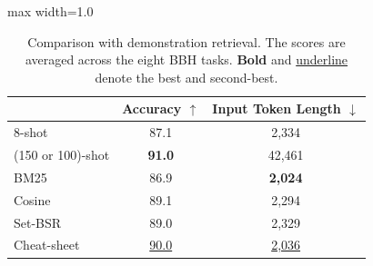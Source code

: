 \begin{table}[t]
\centering
\begin{adjustbox}{max width=1.0\columnwidth}
\begin{tabular}{lcc}
\toprule
 & \textbf{Accuracy} $\uparrow$ & \textbf{Input Token Length} $\downarrow$ \\
\midrule
8-shot & 87.1 & 2,334 \\
(150 or 100)-shot & \textbf{91.0} & 42,461 \\
\midrule
BM25 & 86.9 & \textbf{2,024} \\
Cosine & 89.1 & 2,294 \\
Set-BSR & 89.0 & 2,329 \\
\midrule
Cheat-sheet & \underline{90.0} & \underline{2,036} \\
\bottomrule
\end{tabular}
\end{adjustbox}
\caption{
Comparison with demonstration retrieval.
The scores are averaged across the eight BBH tasks.
\textbf{Bold} and \underline{underline} denote the best and second-best.
}
\label{tab:retrieve}
\end{table}